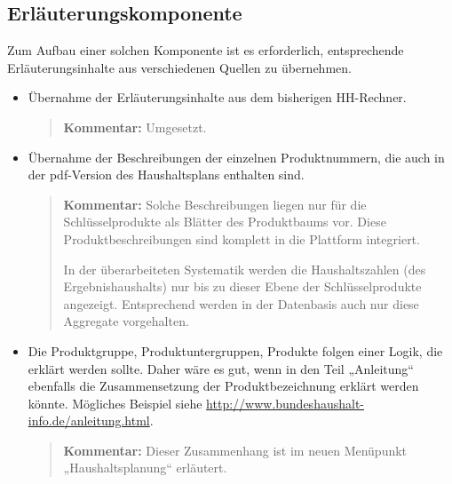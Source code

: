 \documentclass[11pt,a4paper,twoside]{article}
\newcommand{\kommentar}[1]{\begin{quote}\textbf{Kommentar:} #1 \end{quote}}
\begin{document}
\subsection{Erläuterungskomponente}

Zum Aufbau einer solchen Komponente ist es erforderlich, entsprechende
Erläuterungsinhalte aus verschiedenen Quellen zu übernehmen.

\begin{itemize}\itemsep0pt
\item Übernahme der Erläuterungsinhalte aus dem bisherigen HH-Rechner.  
  \kommentar{Umgesetzt.}
\item Übernahme der Beschreibungen der einzelnen Produktnummern, die auch in
  der pdf-Version des Haushaltsplans enthalten sind.  

\kommentar{Solche Beschreibungen liegen nur für die Schlüsselprodukte als
  Blätter des Produktbaums vor.  Diese Produktbeschreibungen sind komplett in
  die Plattform integriert.

  In der überarbeiteten Systematik werden die Haushaltszahlen (des
  Ergebnishaushalts) nur bis zu dieser Ebene der Schlüsselprodukte angezeigt.
  Entsprechend werden in der Datenbasis auch nur diese Aggregate vorgehalten. }

\item Die Produktgruppe, Produktuntergruppen, Produkte folgen einer Logik, die
  erklärt werden sollte. Daher wäre es gut, wenn in den Teil „Anleitung“
  ebenfalls die Zusammensetzung der Produktbezeichnung erklärt werden könnte.
  Mögliches Beispiel siehe
  \url{http://www.bundeshaushalt-info.de/anleitung.html}.

  \kommentar{Dieser Zusammenhang ist im neuen Menüpunkt „Haushaltsplanung“
    erläutert.  }
\end{itemize}
\end{document}
